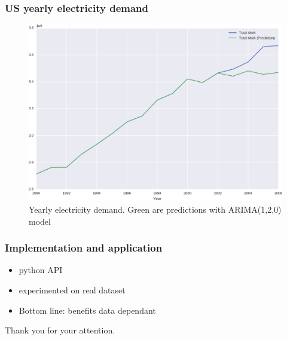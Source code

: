 \documentclass{beamer}
\begin{document}
\begin{frame}
    \frametitle{US yearly electricity demand}
    \begin{figure}[]
      \centering
      \includegraphics[width=0.8\linewidth]{demand}
      \caption{Yearly electricity demand. Green are predictions with ARIMA(1,2,0) model}
    \end{figure}
\end{frame}

\begin{frame}
    \frametitle{Implementation and application}
    \begin{itemize}
        \item python API
        \item experimented on real dataset
        \item Bottom line: benefits data dependant
    \end{itemize}
\end{frame}

\begin{frame}
    \Huge Thank you for your attention.
\end{frame}
\end{document}
